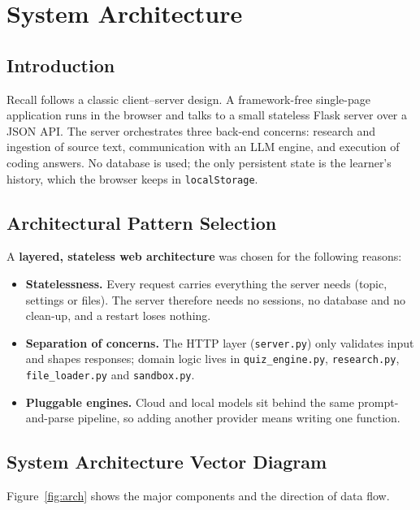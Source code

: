 \chapter{System Architecture}

\section{Introduction}
Recall follows a classic client--server design. A framework-free single-page application runs in the browser and talks to a small stateless Flask server over a JSON API. The server orchestrates three back-end concerns: research and ingestion of source text, communication with an LLM engine, and execution of coding answers. No database is used; the only persistent state is the learner's history, which the browser keeps in \texttt{localStorage}.

\section{Architectural Pattern Selection}
A \textbf{layered, stateless web architecture} was chosen for the following reasons:
\begin{itemize}
\item \textbf{Statelessness.} Every request carries everything the server needs (topic, settings or files). The server therefore needs no sessions, no database and no clean-up, and a restart loses nothing.
\item \textbf{Separation of concerns.} The HTTP layer (\texttt{server.py}) only validates input and shapes responses; domain logic lives in \texttt{quiz\_engine.py}, \texttt{research.py}, \texttt{file\_loader.py} and \texttt{sandbox.py}.
\item \textbf{Pluggable engines.} Cloud and local models sit behind the same prompt-and-parse pipeline, so adding another provider means writing one function.
\end{itemize}

\section{System Architecture Vector Diagram}
Figure~\ref{fig:arch} shows the major components and the direction of data flow.

